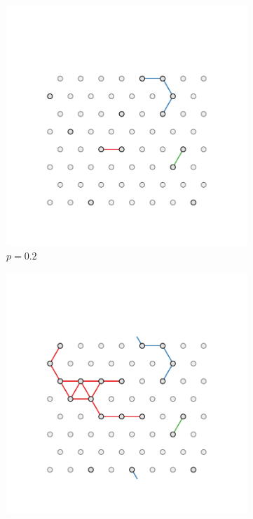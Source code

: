 \begin{figure}[bt]
     \centering
     
     \begin{subfigure}[b]{0.3\textwidth}
         \centering
         \includegraphics[width=\textwidth]{./figures/targeted_opt/perc_tri_2.pdf}
         \caption{$p=0.2$}
         \label{fig:perctri2}
     \end{subfigure}
     \hfill
      \begin{subfigure}[b]{0.3\textwidth}
         \centering
         \includegraphics[width=\textwidth]{./figures/targeted_opt/perc_tri_3.pdf}

\end{subfigure}
\end{figure}

